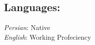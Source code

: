 \documentclass[11pt]{article}
\begin{document}

\subsection{Languages:}
    \emph{Persian}: Native \\
    \emph{English}: Working Profeciency
\end{document}
